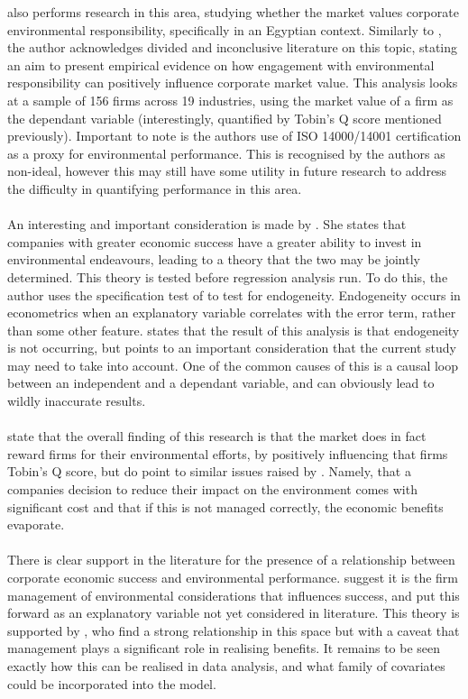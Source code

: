 {\cite{wahba2008does} also performs research in this area, studying whether the market values corporate environmental responsibility, specifically in an Egyptian context. Similarly to \cite{schaltegger2002link}, the author acknowledges divided and inconclusive literature on this topic, stating an aim to present empirical evidence on how engagement with environmental responsibility can positively influence corporate market value. This analysis looks at a sample of 156 firms across 19 industries, using the market value of a firm as the dependant variable (interestingly, quantified by Tobin's Q score mentioned previously). Important to note is the authors use of ISO 14000/14001 certification as a proxy for environmental performance. This is recognised by the authors as non-ideal, however this may still have some utility in future research to address the difficulty in quantifying performance in this area. \\\\
An interesting and important consideration is made by \cite{wahba2008does}. She states that companies with greater economic success have a greater ability to invest in environmental endeavours, leading to a theory that the two may be jointly determined. This theory is tested before regression analysis run. To do this, the author uses the specification test of \cite{hausman1978specification} to test for endogeneity. Endogeneity occurs in econometrics when an explanatory variable correlates with the error term, rather than some other feature. \cite{wahba2008does} states that the result of this analysis is that endogeneity is not occurring, but points to an important consideration that the current study may need to take into account. One of the common causes of this is a causal loop between an independent and a dependant variable, and can obviously lead to wildly inaccurate results. \\\\
 \cite{wahba2008does} state that the overall finding of this research is that the market does in fact reward firms for their environmental efforts, by positively influencing that firms Tobin's Q score, but do point to similar issues raised by \cite{schaltegger2002link}. Namely, that a companies decision to reduce their impact on the environment comes with significant cost and that if this is not managed correctly, the economic benefits evaporate.     \\\\
There is clear support in the literature for the presence of a relationship between corporate economic success and environmental performance. \cite{schaltegger2002link} suggest it is the firm management of environmental considerations that influences success, and put this forward as an explanatory variable not yet considered in literature. This theory is supported by \cite{wahba2008does}, who find a strong relationship in this space but with a caveat that management plays a significant role in realising benefits. It remains to be seen exactly how this can be realised in data analysis, and what family of covariates could be incorporated into the model.  }
